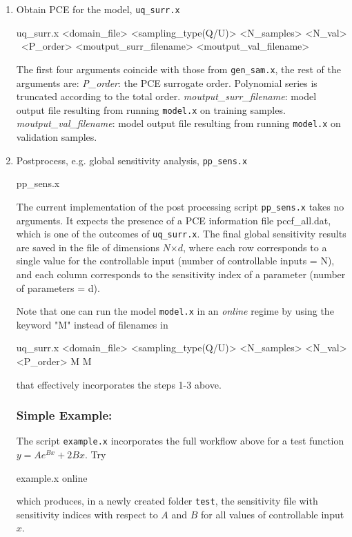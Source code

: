 \begin{enumerate}
\item Obtain PCE for the model, \texttt{uq\_surr.x}
\begin{ShellCmd}
uq_surr.x <domain_file> <sampling_type(Q/U)> <N_samples> <N_val> \
		<P_order> <moutput_surr_filename> <moutput_val_filename>
\end{ShellCmd}

The first four arguments coincide with those from \texttt{gen\_sam.x}, the rest of the arguments are:
\subitem \emph{P\_order}: the PCE surrogate order. Polynomial series is truncated according to the total order.
\subitem \emph{moutput\_surr\_filename}: model output file resulting from running \texttt{model.x} on training samples.
\subitem \emph{moutput\_val\_filename}: model output file resulting from running \texttt{model.x} on validation samples.

\item Postprocess, e.g. global sensitivity analysis, \texttt{pp\_sens.x} 
\begin{ShellCmd}
pp_sens.x
\end{ShellCmd}

The current implementation of the post processing script \texttt{pp\_sens.x} takes no arguments. It expects the presence of a PCE information file pccf\_all.dat, which is one of the outcomes of \texttt{uq\_surr.x}. The final global sensitivity results are saved in the  file of dimensions $N$$\times$$d$, where each row corresponds to a single value for the controllable input (number of controllable inputs = N), and each column corresponds to the sensitivity index of a parameter (number of parameters = d).\\

\medskip

Note that one can run the model \texttt{model.x} in an \emph{online} regime by using the keyword "M" instead of filenames in
\begin{ShellCmd}
uq_surr.x <domain_file> <sampling_type(Q/U)> <N_samples> <N_val> <P_order> M M
\end{ShellCmd}
that effectively incorporates the steps 1-3 above.

\subsubsection{Simple Example:}

The script \texttt{example.x} incorporates the full workflow above for a test function $y=Ae^{Bx}+2Bx$. Try
\begin{ShellCmd}
example.x online
\end{ShellCmd}
which produces, in a newly created folder \texttt{test}, the sensitivity file  with sensitivity indices with respect to $A$ and $B$ for all values of controllable input $x$.



\end{enumerate}


